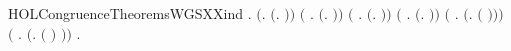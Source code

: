 \begin{SaveVerbatim}{HOLCongruenceTheoremsWGSXXind}
\HOLTokenTurnstile{} \HOLSymConst{\HOLTokenForall{}}.
       \ensuremath{(}\HOLSymConst{\HOLTokenForall{}}.  \ensuremath{(}\HOLTokenLambda{}. \ensuremath{)}\ensuremath{)} \HOLSymConst{\HOLTokenConj{}}
       \ensuremath{(}\HOLSymConst{\HOLTokenForall{}} .   \HOLSymConst{\HOLTokenImp{}}  \ensuremath{(}\HOLTokenLambda{}. \HOLSymConst{\ensuremath{\ldotp}} \ensuremath{)}\ensuremath{)} \HOLSymConst{\HOLTokenConj{}}
       \ensuremath{(}\HOLSymConst{\HOLTokenForall{}}   .
              \HOLSymConst{\HOLTokenConj{}}   \HOLSymConst{\HOLTokenImp{}}
             \ensuremath{(}\HOLTokenLambda{}. \HOLSymConst{\ensuremath{\ldotp}}  \HOLSymConst{\ensuremath{+}} \HOLSymConst{\ensuremath{\ldotp}} \ensuremath{)}\ensuremath{)} \HOLSymConst{\HOLTokenConj{}}
       \ensuremath{(}\HOLSymConst{\HOLTokenForall{}} .   \HOLSymConst{\HOLTokenConj{}}   \HOLSymConst{\HOLTokenImp{}}  \ensuremath{(}\HOLTokenLambda{}.   \HOLSymConst{\ensuremath{\mid}}  \ensuremath{)}\ensuremath{)} \HOLSymConst{\HOLTokenConj{}}
       \ensuremath{(}\HOLSymConst{\HOLTokenForall{}} .   \HOLSymConst{\HOLTokenImp{}}  \ensuremath{(}\HOLTokenLambda{}.   \ensuremath{(} \ensuremath{)}\ensuremath{)}\ensuremath{)} \HOLSymConst{\HOLTokenConj{}}
       \ensuremath{(}\HOLSymConst{\HOLTokenForall{}} .   \HOLSymConst{\HOLTokenImp{}}  \ensuremath{(}\HOLTokenLambda{}.  \ensuremath{(} \ensuremath{)} \ensuremath{)}\ensuremath{)} \HOLSymConst{\HOLTokenImp{}}
       \HOLSymConst{\HOLTokenForall{}}.   \HOLSymConst{\HOLTokenImp{}}  
\end{SaveVerbatim}
